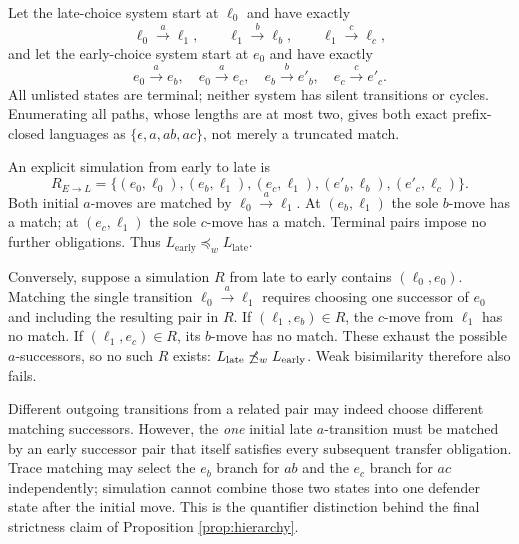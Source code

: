 \documentclass{ws-jbcb}
\numberwithin{equation}{section}
\newcommand{\weakpre}{\mathrel{\preceq_{w}}}
\begin{document}
\begin{example}\label{ex:branching}
Let the late-choice system start at $\ell_0$ and have exactly
\begin{equation}\label{eq:late-choice}
\ell_0\xrightarrow{a}\ell_1,\qquad
\ell_1\xrightarrow{b}\ell_b,\qquad \ell_1\xrightarrow{c}\ell_c,
\end{equation}
and let the early-choice system start at $e_0$ and have exactly
\begin{equation}\label{eq:early-choice}
e_0\xrightarrow{a}e_b,\quad e_0\xrightarrow{a}e_c,\quad
e_b\xrightarrow{b}e'_b,\quad e_c\xrightarrow{c}e'_c.
\end{equation}
All unlisted states are terminal; neither system has silent transitions or
cycles. Enumerating all paths, whose lengths are at most two, gives both exact
prefix-closed languages as $\{\epsilon,a,ab,ac\}$, not merely a truncated match.

An explicit simulation from early to late is
\begin{equation}\label{eq:early-late-witness}
R_{E\to L}=\{(e_0,\ell_0),(e_b,\ell_1),(e_c,\ell_1),
(e'_b,\ell_b),(e'_c,\ell_c)\}.
\end{equation}
Both initial $a$-moves are matched by $\ell_0\xrightarrow{a}\ell_1$.
At $(e_b,\ell_1)$ the sole $b$-move has a match; at $(e_c,\ell_1)$ the sole
$c$-move has a match. Terminal pairs impose no further obligations. Thus
$L_{\mathrm{early}}\weakpre L_{\mathrm{late}}$.

Conversely, suppose a simulation $R$ from late to early contains
$(\ell_0,e_0)$. Matching the single transition
$\ell_0\xrightarrow{a}\ell_1$ requires choosing one successor of $e_0$ and
including the resulting pair in $R$. If $(\ell_1,e_b)\in R$, the $c$-move
from $\ell_1$ has no match. If $(\ell_1,e_c)\in R$, its $b$-move has no
match. These exhaust the possible $a$-successors, so no such $R$ exists:
$L_{\mathrm{late}}\not\weakpre L_{\mathrm{early}}$. Weak bisimilarity
therefore also fails.

Different outgoing transitions from a related pair may indeed choose different
matching successors. However, the \emph{one} initial late $a$-transition must
be matched by an early successor pair that itself satisfies every subsequent
transfer obligation. Trace matching may select the $e_b$ branch for $ab$ and
the $e_c$ branch for $ac$ independently; simulation cannot combine those two
states into one defender state after the initial move. This is the quantifier
distinction behind the final strictness claim of Proposition
\ref{prop:hierarchy}.
\end{example}
\end{document}
